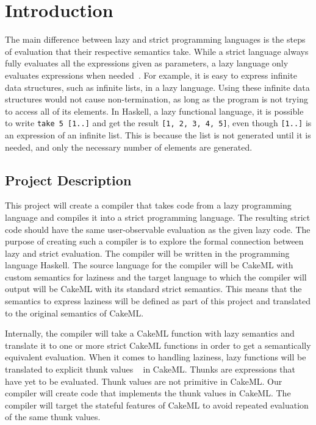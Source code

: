 \section{Introduction}

The main difference between lazy and strict programming languages is the steps
of evaluation that their respective semantics take. While a strict language
always fully evaluates all the expressions given as parameters, a lazy language
only evaluates expressions when needed~\cite{ThunkHas27:online}. For example, it is easy to express
infinite data structures, such as infinite lists, in a lazy language. Using
these infinite data structures would not cause non-termination, as long as the
program is not trying to access all of its elements. In Haskell, a lazy
functional language, it is possible to write \texttt{take 5 [1..]} and get the
result \texttt{[1, 2, 3, 4, 5]}, even though \texttt{[1..]} is
an expression of an infinite list. This is because the list is not generated
until it is needed, and only the necessary number of elements are generated.

\subsection{Project Description}

This project will create a compiler that takes code from a lazy programming
language and compiles it into a strict programming language. The resulting
strict code should have the same user-observable evaluation as the given lazy
code. The purpose of creating such a compiler is to explore the formal
connection between lazy and strict evaluation. The compiler will be written in
the programming language Haskell. The source language for the compiler will be
CakeML with custom semantics for laziness and the target language to which
the compiler will output will be CakeML with its standard strict semantics. This
means that the semantics to express laziness will be defined as part of this
project and translated to the original semantics of CakeML.

Internally, the compiler will take a
CakeML function with lazy semantics and translate it to one
or more strict CakeML functions in order to get a semantically equivalent
evaluation. When it comes to handling laziness, lazy functions will be
translated to explicit thunk values ~\cite{Ingerman:1961:TWC:366062.366084} in
CakeML. Thunks are expressions that have yet to be evaluated. Thunk values are
not primitive in CakeML. Our compiler will create code that
implements the thunk values in CakeML. The compiler will target the stateful
features of CakeML to avoid repeated evaluation of the same thunk values.

